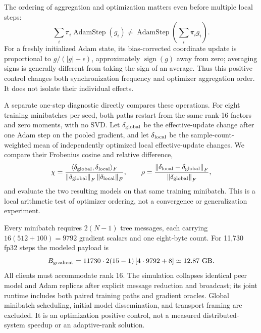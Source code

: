 \documentclass[11pt]{article}
\newcommand{\norm}[1]{\left\lVert#1\right\rVert}
\begin{document}
The ordering of aggregation and optimization matters even before multiple local steps:
\begin{equation}
 \sum_i\pi_i\operatorname{AdamStep}(g_i)
 \ne\operatorname{AdamStep}\left(\sum_i\pi_i g_i\right).
 \label{eq:adam-noncommutation}
\end{equation}
For a freshly initialized Adam state, its bias-corrected coordinate update is proportional to $g/(|g|+\epsilon)$, approximately $\operatorname{sign}(g)$ away from zero; averaging signs is generally different from taking the sign of an average. Thus this positive control changes both synchronization frequency and optimizer aggregation order. It does not isolate their individual effects.

A separate one-step diagnostic directly compares these operations. For eight training minibatches per seed, both paths restart from the same rank-16 factors and zero moments, with no SVD. Let $\delta_{\rm global}$ be the effective-update change after one Adam step on the pooled gradient, and let $\delta_{\rm local}$ be the sample-count-weighted mean of independently optimized local effective-update changes. We compare their Frobenius cosine and relative difference,
\begin{equation}
 \chi=\frac{\langle\delta_{\rm global},\delta_{\rm local}\rangle_F}
 {\norm{\delta_{\rm global}}_F\norm{\delta_{\rm local}}_F},
 \qquad
 \rho=\frac{\norm{\delta_{\rm local}-\delta_{\rm global}}_F}
 {\norm{\delta_{\rm global}}_F},
 \label{eq:adam-order-diagnostics}
\end{equation}
and evaluate the two resulting models on that same training minibatch. This is a local arithmetic test of optimizer ordering, not a convergence or generalization experiment.

Every minibatch requires $2(N-1)$ tree messages, each carrying $16(512+100)=9792$ gradient scalars and one eight-byte count. For 11,730 fp32 steps the modeled payload is
\begin{equation}
 B_{\rm gradient}=11730\cdot2(15-1)\,[4\cdot9792+8]
 \simeq12.87\ {\rm GB}.
\end{equation}
All clients must accommodate rank 16. The simulation collapses identical peer model and Adam replicas after explicit message reduction and broadcast; its joint runtime includes both paired training paths and gradient oracles. Global minibatch scheduling, initial model dissemination, and transport framing are excluded. It is an optimization positive control, not a measured distributed-system speedup or an adaptive-rank solution.
\end{document}
